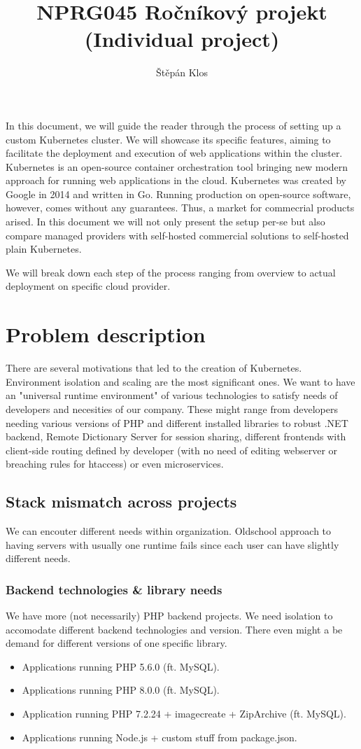 \documentclass{article}
\title{NPRG045 Ročníkový projekt (Individual project)}
\author{Štěpán Klos}
\date{}
\begin{document}
\maketitle

In this document, we will guide the reader through the process of setting up a custom Kubernetes cluster. We will showcase its specific features, aiming to facilitate the deployment and execution of web applications within the cluster.
\bigbreak
Kubernetes is an open-source container orchestration tool bringing new modern approach for running web applications in the cloud. Kubernetes was created by Google in 2014 and written in Go. Running production on open-source software, however, comes without any guarantees. Thus, a market for commecrial products arised. In this document we will not only present the setup per-se but also compare managed providers with self-hosted commercial solutions to self-hosted plain Kubernetes. \par
\bigbreak
We will break down each step of the process ranging from overview to actual deployment on specific cloud provider.   

\section{Problem description}
There are several motivations that led to the creation of Kubernetes. Environment isolation and scaling are the most significant ones. We want to have an "universal runtime environment" of various technologies to satisfy needs of developers and necesities of our company. These might range from developers needing various versions of PHP and different installed libraries to robust .NET backend, Remote Dictionary Server for session sharing, different frontends with client-side routing defined by developer (with no need of editing webserver or breaching rules for htaccess) or even microservices. 
\subsection{Stack mismatch across projects}
We can encouter different needs within organization. Oldschool approach to having servers with usually one runtime fails since each user can have slightly different needs.
\subsubsection{Backend technologies \& library needs}
We have more (not necessarily) PHP backend projects. We need isolation to accomodate different backend technologies and version. There even might a be demand for different versions of one specific library.
\begin{itemize}
  \item Applications running PHP 5.6.0 (ft. MySQL).
  \item Applications running PHP 8.0.0 (ft. MySQL).
  \item Application running PHP 7.2.24 + imagecreate + ZipArchive (ft. MySQL).
  \item Applications running Node.js + custom stuff from package.json.
\end{itemize}
\end{document}

